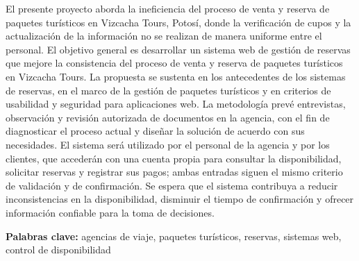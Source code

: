 
El presente proyecto aborda la ineficiencia del proceso de venta y reserva
de paquetes turísticos en Vizcacha Tours, Potosí, donde la verificación de
cupos y la actualización de la información no se realizan de manera uniforme
entre el personal. El objetivo general es desarrollar un sistema web de
gestión de reservas que mejore la consistencia del proceso de venta y reserva
de paquetes turísticos en Vizcacha Tours. La propuesta se sustenta en los
antecedentes de los sistemas de reservas, en el marco de la gestión de
paquetes turísticos y en criterios de usabilidad y seguridad para
aplicaciones web. La metodología prevé entrevistas, observación y revisión
autorizada de documentos en la agencia, con el fin de diagnosticar el proceso
actual y diseñar la solución de acuerdo con sus necesidades. El sistema será
utilizado por el personal de la agencia y por los clientes, que accederán con
una cuenta propia para consultar la disponibilidad, solicitar reservas y
registrar sus pagos; ambas entradas siguen el mismo criterio de validación y
de confirmación. Se espera que el sistema contribuya a reducir inconsistencias
en la disponibilidad, disminuir el tiempo de confirmación y ofrecer
información confiable para la toma de decisiones.

\vspace{0.5\baselineskip}
\noindent\textbf{Palabras clave:} agencias de viaje, paquetes turísticos,
reservas, sistemas web, control de disponibilidad
